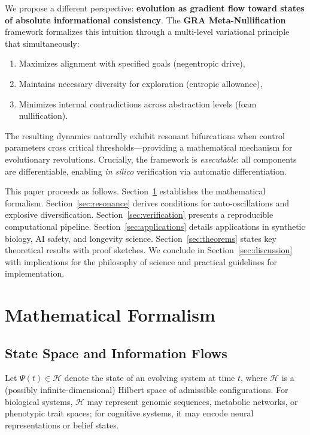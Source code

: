 \documentclass[11pt,a4paper]{article}
\theoremstyle{plain}
\theoremstyle{definition}
\theoremstyle{remark}
\newcommand{\Hilbert}{\mathcal{H}}
\begin{document}
We propose a different perspective: \textbf{evolution as gradient flow toward states of absolute informational consistency}. The \textbf{GRA Meta-Nullification} framework formalizes this intuition through a multi-level variational principle that simultaneously:
\begin{enumerate}[label=(\roman*)]
    \item Maximizes alignment with specified goals (negentropic drive),
    \item Maintains necessary diversity for exploration (entropic allowance),
    \item Minimizes internal contradictions across abstraction levels (foam nullification).
\end{enumerate}

The resulting dynamics naturally exhibit resonant bifurcations when control parameters cross critical thresholds---providing a mathematical mechanism for evolutionary revolutions. Crucially, the framework is \textit{executable}: all components are differentiable, enabling \textit{in silico} verification via automatic differentiation.

This paper proceeds as follows. Section~\ref{sec:formalism} establishes the mathematical formalism. Section~\ref{sec:resonance} derives conditions for auto-oscillations and explosive diversification. Section~\ref{sec:verification} presents a reproducible computational pipeline. Section~\ref{sec:applications} details applications in synthetic biology, AI safety, and longevity science. Section~\ref{sec:theorems} states key theoretical results with proof sketches. We conclude in Section~\ref{sec:discussion} with implications for the philosophy of science and practical guidelines for implementation.

\section{Mathematical Formalism}
\label{sec:formalism}

\subsection{State Space and Information Flows}

Let $\Psi(t) \in \Hilbert$ denote the state of an evolving system at time $t$, where $\Hilbert$ is a (possibly infinite-dimensional) Hilbert space of admissible configurations. For biological systems, $\Hilbert$ may represent genomic sequences, metabolic networks, or phenotypic trait spaces; for cognitive systems, it may encode neural representations or belief states.
\end{document}
